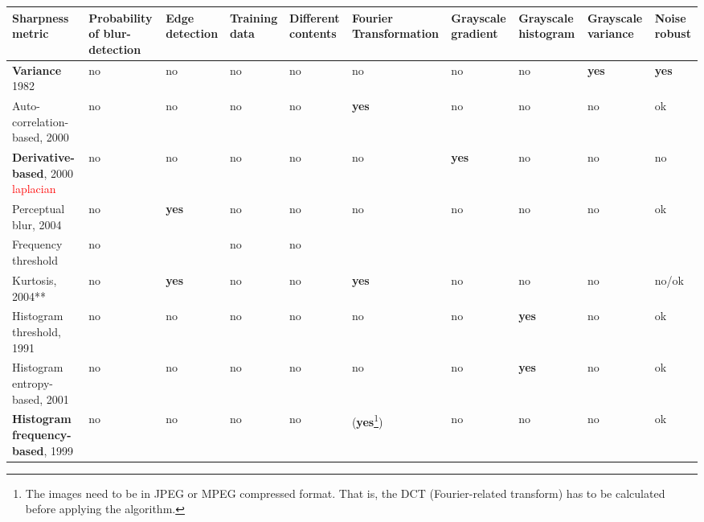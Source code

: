 \setlength\LTleft{-3cm}\begin{longtable}{|| p{} || p{} | p{} | p{} | p{} | p{} | p{} | p{} | p{} | p{} ||}\hline
    Sharpness metric & Probability of blur-detection 
        & Edge detection & Training data & Different contents & Fourier Transformation & Grayscale gradient & Grayscale histogram & Grayscale variance & Noise robust \\\hline\hline
    \textbf{Variance}\cite{jnbm05} 1982                                & %
        no & no & no & no & no & no & no & \textbf{yes} & \textbf{yes} \\\hline
    Auto-correlation-based\cite{jnbm06}, 2000                  & %
        no & no & no & no & \textbf{yes} & no & no & no & ok \\\hline
    \textbf{Derivative-based}\cite{jnbm06}, 2000 \textcolor{red}{laplacian}                     & %
        no & no & no & no & no & \textbf{yes} & no & no & no \\\hline
    Perceptual blur\cite{jnbm07}, 2004                       & %
        no & \textbf{yes} & no & no & no & no & no & no & ok \\\hline
    Frequency threshold\cite{jnbm08} &
    no & & no & no &  &  & &  & \\\hline
    Kurtosis\cite{jnbm09}\cite{jnbm10}, 2004**             & 
        no & \textbf{yes} & no & no & \textbf{yes} & no & no & no & no/ok\\\hline
    Histogram threshold\cite{jnbm08}, 1991 & %
        no & no & no & no & no & no & \textbf{yes} & no & ok \\\hline
    Histogram entropy-based\cite{jnbm11}, 2001 & %
        no & no & no & no & no & no & \textbf{yes} & no & ok \\\hline
    \textbf{Histogram frequency-based}\cite{jnbm12}, 1999 & %
        no & no & no & no & (\textbf{yes}\footnote{The images need to be in JPEG or MPEG compressed format. That is, the DCT (Fourier-related transform) has to be calculated before applying the algorithm.}) & no & no & no & ok \\\hline

\end{longtable}
